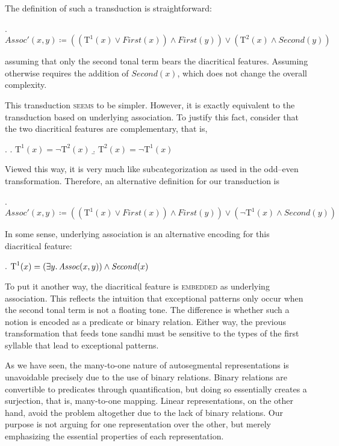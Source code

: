\documentclass[12pt, a4paper]{report}
\newcommand{\textemph}[1]{\textsc{#1}}
\begin{document}
The definition of such a transduction is straightforward:

\ex. \(\mathit{Assoc}'(x, y) \coloneq
((\text{T}^{1}(x) \lor \mathit{First}(x))
\land \mathit{First}(y)) \lor
(\text{T}^{2}(x) \land \mathit{Second}(y))\)

assuming that only the second tonal term bears the diacritical
features.  Assuming otherwise requires the addition of
\(\mathit{Second}(x)\), which does not change the overall complexity.

This transduction \textemph{seems} to be simpler.  However, it is
exactly equivalent to the transduction based on underlying
association.  To justify this fact, consider that the two diacritical
features are complementary, that is,

\ex.
\a. \(\text{T}^{1}(x) = \neg\text{T}^{2}(x)\)
\b. \(\text{T}^{2}(x) = \neg\text{T}^{1}(x)\)

Viewed this way, it is very much like subcategorization as used in the
odd--even transformation.  Therefore, an alternative definition for
our transduction is

\ex. \(\mathit{Assoc}'(x, y) \coloneq
((\text{T}^{1}(x) \lor \mathit{First}(x))
\land \mathit{First}(y)) \lor
(\neg\text{T}^{1}(x) \land \mathit{Second}(y))\)

In some sense, underlying association is an alternative encoding for
this diacritical feature:

\ex. \(\text{T}^{1}(x) = (\exists y\ldotp \mathit{Assoc}(x, y)) \land
\mathit{Second}(x)\)

To put it another way, the diacritical feature is \textemph{embedded}
as underlying association.  This reflects the intuition that
exceptional patterns only occur when the second tonal term is not a
floating tone.  The difference is whether such a notion is encoded as
a predicate or binary relation.  Either way, the previous
transformation that feeds tone sandhi must be sensitive to the types
of the first syllable that lead to exceptional patterns.

As we have seen, the many-to-one nature of autosegmental
representations is unavoidable precisely due to the use of binary
relations.  Binary relations are convertible to predicates through
quantification, but doing so essentially creates a surjection, that
is, many-to-one mapping.  Linear representations, on the other hand,
avoid the problem altogether due to the lack of binary relations.  Our
purpose is not arguing for one representation over the other, but
merely emphasizing the essential properties of each representation.
\end{document}
